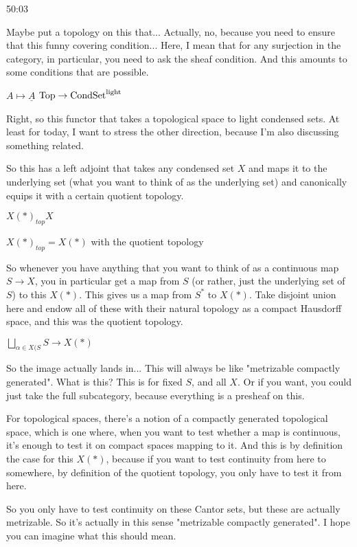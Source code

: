 \begin{example}
\begin{unfinished}{50:03}
\begin{remark}
Maybe put a topology on this that... Actually, no, because you need to ensure that this funny covering condition... Here, I mean that for any surjection in the category, in particular, you need to ask the sheaf condition. And this amounts to some conditions that are possible.

\end{remark}


\begin{proposition}
$A \mapsto \underline{A}$
$\mathrm{Top} \to \mathrm{Cond}\mathrm{Set}^{\mathrm{light}}$
\end{proposition}
Right, so this functor that takes a topological space to light condensed sets. At least for today, I want to stress the other direction, because I'm also discussing something related.

So this has a left adjoint that takes any condensed set $X$ and maps it to the underlying set (what you want to think of as the underlying set) and canonically equips it with a certain quotient topology.

$ X(\ast)_{top} X$

$ X(\ast)_{top} = X(\ast) $
with the quotient topology 

So whenever you have anything that you want to think of as a continuous map $S \to X$, you in particular get a map from $S$ (or rather, just the underlying set of $S$) to this $X(\ast)$. This gives us a map from $S^{\ast}$ to $X(\ast)$. Take disjoint union here and endow all of these with their natural topology as a compact Hausdorff space, and this was the quotient topology.

$ \bigsqcup_{\alpha \in X(S} S \to X(\ast)$

So the image actually lands in... This will always be like "metrizable compactly generated". What is this? This is for fixed $S$, and all $X$. Or if you want, you could just take the full subcategory, because everything is a presheaf on this.

For topological spaces, there's a notion of a compactly generated topological space, which is one where, when you want to test whether a map is continuous, it's enough to test it on compact spaces mapping to it. And this is by definition the case for this $X(\ast)$, because if you want to test continuity from here to somewhere, by definition of the quotient topology, you only have to test it from here.

So you only have to test continuity on these Cantor sets, but these are actually metrizable. So it's actually in this sense "metrizable compactly generated". I hope you can imagine what this should mean.


\end{unfinished}
\end{example}
